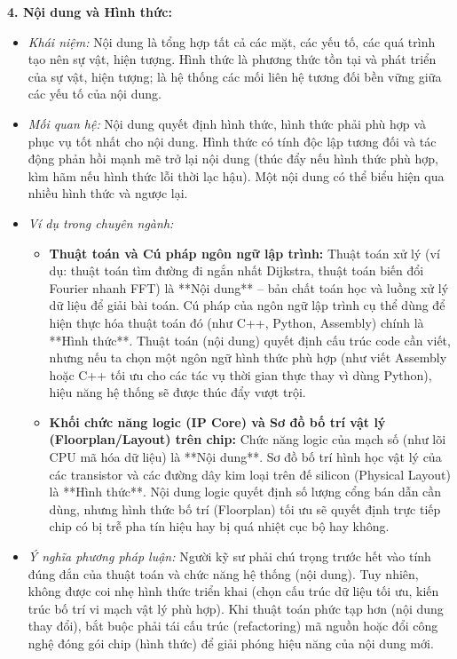 \documentclass[12pt,a4paper]{article}
\begin{document}
{\noindent
\textbf{4. Nội dung và Hình thức:}
\begin{itemize}
    \item \textit{Khái niệm:} Nội dung là tổng hợp tất cả các mặt, các yếu tố, các quá trình tạo nên sự vật, hiện tượng. Hình thức là phương thức tồn tại và phát triển của sự vật, hiện tượng; là hệ thống các mối liên hệ tương đối bền vững giữa các yếu tố của nội dung.
    \item \textit{Mối quan hệ:} Nội dung quyết định hình thức, hình thức phải phù hợp và phục vụ tốt nhất cho nội dung. Hình thức có tính độc lập tương đối và tác động phản hồi mạnh mẽ trở lại nội dung (thúc đẩy nếu hình thức phù hợp, kìm hãm nếu hình thức lỗi thời lạc hậu). Một nội dung có thể biểu hiện qua nhiều hình thức và ngược lại.
    \item \textit{Ví dụ trong chuyên ngành:}
    \begin{itemize}
        \item \textbf{Thuật toán và Cú pháp ngôn ngữ lập trình:} Thuật toán xử lý (ví dụ: thuật toán tìm đường đi ngắn nhất Dijkstra, thuật toán biến đổi Fourier nhanh FFT) là **Nội dung** -- bản chất toán học và luồng xử lý dữ liệu để giải bài toán. Cú pháp của ngôn ngữ lập trình cụ thể dùng để hiện thực hóa thuật toán đó (như C++, Python, Assembly) chính là **Hình thức**. Thuật toán (nội dung) quyết định cấu trúc code cần viết, nhưng nếu ta chọn một ngôn ngữ hình thức phù hợp (như viết Assembly hoặc C++ tối ưu cho các tác vụ thời gian thực thay vì dùng Python), hiệu năng hệ thống sẽ được thúc đẩy vượt trội.
        \item \textbf{Khối chức năng logic (IP Core) và Sơ đồ bố trí vật lý (Floorplan/Layout) trên chip:} Chức năng logic của mạch số (như lõi CPU mã hóa dữ liệu) là **Nội dung**. Sơ đồ bố trí hình học vật lý của các transistor và các đường dây kim loại trên đế silicon (Physical Layout) là **Hình thức**. Nội dung logic quyết định số lượng cổng bán dẫn cần dùng, nhưng hình thức bố trí (Floorplan) tối ưu sẽ quyết định trực tiếp chip có bị trễ pha tín hiệu hay bị quá nhiệt cục bộ hay không.
    \end{itemize}
    \item \textit{Ý nghĩa phương pháp luận:} Người kỹ sư phải chú trọng trước hết vào tính đúng đắn của thuật toán và chức năng hệ thống (nội dung). Tuy nhiên, không được coi nhẹ hình thức triển khai (chọn cấu trúc dữ liệu tối ưu, kiến trúc bố trí vi mạch vật lý phù hợp). Khi thuật toán phức tạp hơn (nội dung thay đổi), bắt buộc phải tái cấu trúc (refactoring) mã nguồn hoặc đổi công nghệ đóng gói chip (hình thức) để giải phóng hiệu năng của nội dung mới.
\end{itemize}

}
\end{document}
